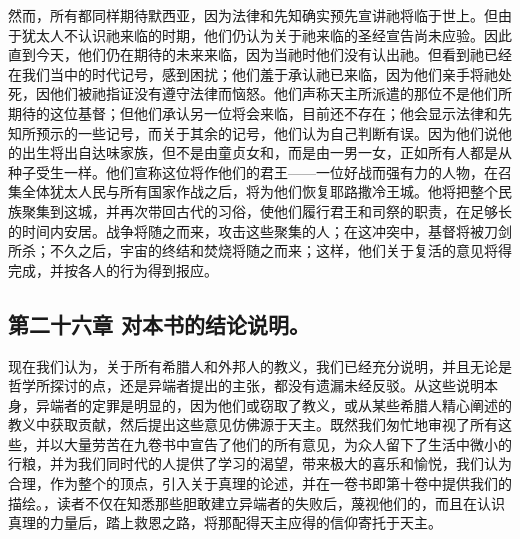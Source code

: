 然而，所有都同样期待默西亚，因为法律和先知确实预先宣讲祂将临于世上。但由于犹太人不认识祂来临的时期，他们仍认为关于祂来临的圣经宣告尚未应验。因此直到今天，他们仍在期待的未来来临，因为当祂时他们没有认出祂。但看到祂已经在我们当中的时代记号，感到困扰；他们羞于承认祂已来临，因为他们亲手将祂处死，因他们被祂指证没有遵守法律而恼怒。他们声称天主所派遣的那位不是他们所期待的这位基督；但他们承认另一位将会来临，目前还不存在；他会显示法律和先知所预示的一些记号，而关于其余的记号，他们认为自己判断有误。因为他们说他的出生将出自达味家族，但不是由童贞女和，而是由一男一女，正如所有人都是从种子受生一样。他们宣称这位将作他们的君王——一位好战而强有力的人物，在召集全体犹太人民与所有国家作战之后，将为他们恢复耶路撒冷王城。他将把整个民族聚集到这城，并再次带回古代的习俗，使他们履行君王和司祭的职责，在足够长的时间内安居。战争将随之而来，攻击这些聚集的人；在这冲突中，基督将被刀剑所杀；不久之后，宇宙的终结和焚烧将随之而来；这样，他们关于复活的意见将得完成，并按各人的行为得到报应。\par


\subsection{第二十六章 对本书的结论说明。}

现在我们认为，关于所有希腊人和外邦人的教义，我们已经充分说明，并且无论是哲学所探讨的点，还是异端者提出的主张，都没有遗漏未经反驳。从这些说明本身，异端者的定罪是明显的，因为他们或窃取了教义，或从某些希腊人精心阐述的教义中获取贡献，然后提出这些意见仿佛源于天主。既然我们匆忙地审视了所有这些，并以大量劳苦在九卷书中宣告了他们的所有意见，为众人留下了生活中微小的行粮，并为我们同时代的人提供了学习的渴望，带来极大的喜乐和愉悦，我们认为合理，作为整个的顶点，引入关于真理的论述，并在一卷书即第十卷中提供我们的描绘。，读者不仅在知悉那些胆敢建立异端者的失败后，蔑视他们的，而且在认识真理的力量后，踏上救恩之路，将那配得天主应得的信仰寄托于天主。\par


